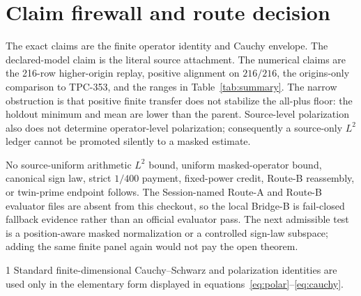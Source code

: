 \documentclass[10pt]{article}
\begin{document}
\section{Claim firewall and route decision}

The exact claims are the finite operator identity and Cauchy envelope.  The
declared-model claim is the literal source attachment.  The numerical claims
are the 216-row higher-origin replay, positive alignment on $216/216$, the
origins-only comparison to TPC-353, and the ranges in Table~\ref{tab:summary}.
The narrow obstruction is that positive finite transfer does not stabilize the
all-plus floor: the holdout minimum and mean are lower than the parent.
Source-level polarization also does not determine operator-level polarization;
consequently a source-only $L^2$ ledger cannot be promoted silently to a masked
estimate.

No source-uniform arithmetic $L^2$ bound, uniform masked-operator bound,
canonical sign law, strict $1/400$ payment, fixed-power credit, Route-B
reassembly, or twin-prime endpoint follows.  The Session-named Route-A and
Route-B evaluator files are absent from this checkout, so the local Bridge-B
is fail-closed fallback evidence rather than an official evaluator pass.
The next admissible test is a position-aware masked normalization or a
controlled sign-law subspace; adding the same finite panel again would not pay
the open theorem.

\begin{thebibliography}{1}
Standard finite-dimensional Cauchy--Schwarz and polarization identities are
used only in the elementary form displayed in equations~\eqref{eq:polar}--\eqref{eq:cauchy}.
\end{thebibliography}
\end{document}
